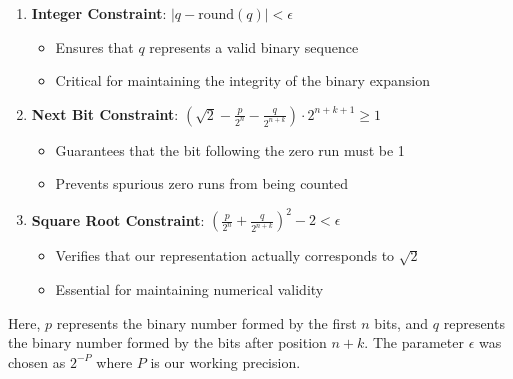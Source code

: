 \begin{enumerate}
    \item \textbf{Integer Constraint}: $|q - \text{round}(q)| < \epsilon$
        \begin{itemize}
            \item Ensures that $q$ represents a valid binary sequence
            \item Critical for maintaining the integrity of the binary expansion
        \end{itemize}
    
    \item \textbf{Next Bit Constraint}: $\left(\sqrt{2} - \frac{p}{2^n} - \frac{q}{2^{n+k}}\right) \cdot 2^{n+k+1} \geq 1$
        \begin{itemize}
            \item Guarantees that the bit following the zero run must be 1
            \item Prevents spurious zero runs from being counted
        \end{itemize}
    
    \item \textbf{Square Root Constraint}: $\left(\frac{p}{2^n} + \frac{q}{2^{n+k}}\right)^2 - 2 < \epsilon$
        \begin{itemize}
            \item Verifies that our representation actually corresponds to $\sqrt{2}$
            \item Essential for maintaining numerical validity
        \end{itemize}
\end{enumerate}

Here, $p$ represents the binary number formed by the first $n$ bits, and $q$ represents the binary number formed by the bits after position $n+k$. The parameter $\epsilon$ was chosen as $2^{-P}$ where $P$ is our working precision.

